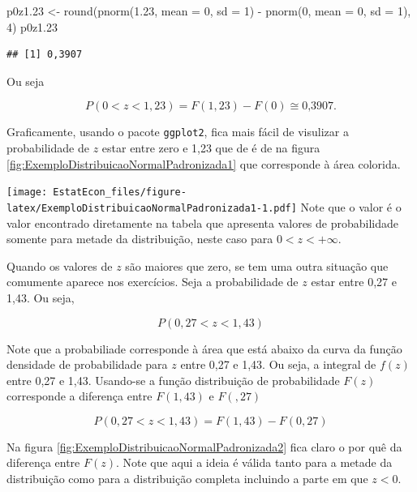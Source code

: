 \documentclass[
]{book}
\newenvironment{Shaded}{\begin{snugshade}}{\end{snugshade}}
\newcommand{\AttributeTok}[1]{\textcolor[rgb]{0.77,0.63,0.00}{#1}}
\newcommand{\DecValTok}[1]{\textcolor[rgb]{0.00,0.00,0.81}{#1}}
\newcommand{\FloatTok}[1]{\textcolor[rgb]{0.00,0.00,0.81}{#1}}
\newcommand{\FunctionTok}[1]{\textcolor[rgb]{0.00,0.00,0.00}{#1}}
\newcommand{\NormalTok}[1]{#1}
\newcommand{\OtherTok}[1]{\textcolor[rgb]{0.56,0.35,0.01}{#1}}
\newcommand{\SpecialCharTok}[1]{\textcolor[rgb]{0.00,0.00,0.00}{#1}}
\begin{document}
\begin{Shaded}
\begin{Highlighting}[]
\NormalTok{p0z1}\FloatTok{.23} \OtherTok{\textless{}{-}} \FunctionTok{round}\NormalTok{(}\FunctionTok{pnorm}\NormalTok{(}\FloatTok{1.23}\NormalTok{, }\AttributeTok{mean =} \DecValTok{0}\NormalTok{, }\AttributeTok{sd =} \DecValTok{1}\NormalTok{) }\SpecialCharTok{{-}} \FunctionTok{pnorm}\NormalTok{(}\DecValTok{0}\NormalTok{, }
    \AttributeTok{mean =} \DecValTok{0}\NormalTok{, }\AttributeTok{sd =} \DecValTok{1}\NormalTok{), }\DecValTok{4}\NormalTok{)}
\NormalTok{p0z1}\FloatTok{.23}
\end{Highlighting}
\end{Shaded}

\begin{verbatim}
## [1] 0,3907
\end{verbatim}

Ou seja

\[
  P(0 < z < 1,23) = F(1,23) - F(0) \cong \text{0,3907}.
\]

Graficamente, usando o pacote \texttt{ggplot2}, fica mais fácil de visulizar a probabilidade de \(z\) estar entre zero e 1,23 que de é de  na figura \ref{fig:ExemploDistribuicaoNormalPadronizada1} que corresponde à área colorida.

\texttt{[image: EstatEcon\_files/figure-latex/ExemploDistribuicaoNormalPadronizada1-1.pdf]}
Note que o valor  é o valor encontrado diretamente na tabela que apresenta valores de probabilidade somente para metade da distribuição, neste caso para \(0<z<+\infty\).

Quando os valores de \(z\) são maiores que zero, se tem uma outra situação que comumente aparece nos exercícios. Seja a probabilidade de \(z\) estar entre 0,27 e 1,43. Ou seja,

\[
  P(0,27 < z < 1,43) 
\]

Note que a probabiliade corresponde à área que está abaixo da curva da função densidade de probabilidade para \(z\) entre 0,27 e 1,43. Ou seja, a integral de \(f(z)\) entre 0,27 e 1,43. Usando-se a função distribuição de probabilidade \(F(z)\) corresponde a diferença entre \(F(1,43)\) e \(F(,27)\)

\[
  P(0,27 < z < 1,43) = F(1,43) - F(0,27)
\]

Na figura \ref{fig:ExemploDistribuicaoNormalPadronizada2} fica claro o por quê da diferença entre \(F(z)\). Note que aqui a ideia é válida tanto para a metade da distribuição como para a distribuição completa incluindo a parte em que \(z<0\).
\end{document}
